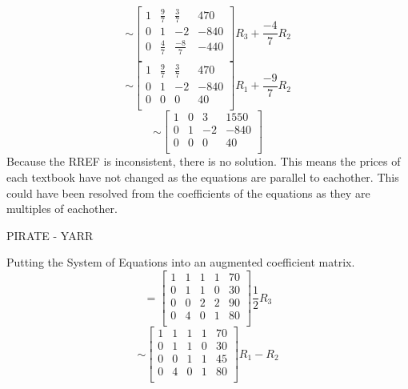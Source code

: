 \documentclass[12pt]{article}
\newenvironment{problem}[2][Problem]{\begin{trivlist}
\item[\hskip \labelsep {\bfseries #1}\hskip \labelsep {\bfseries #2.}]}{\end{trivlist}}
\begin{document}
	\[\sim
		\left[
		\begin{array}{ccc|c}
		1 & \frac{9}{7} & \frac{3}{7} & 470\\
		0 & 1 & -2 & -840\\
		0 & \frac{4}{7} & \frac{-8}{7} & -440\\
		\end{array}
		\right] R_3 + \frac{-4}{7}R_2
	\]
	\[\sim
		\left[
		\begin{array}{ccc|c}
		1 & \frac{9}{7} & \frac{3}{7} & 470\\
		0 & 1 & -2 & -840\\
		0 & 0 & 0 & 40\\
		\end{array}
		\right] R_1 + \frac{-9}{7}R_2
	\]
	\[\sim
		\left[
		\begin{array}{ccc|c}
		1 & 0 & 3 & 1550\\
		0 & 1 & -2 & -840\\
		0 & 0 & 0 & 40\\
		\end{array}
		\right] 
	\]
Because the RREF is inconsistent, there is no solution. This means the prices of each textbook have not changed as the equations are parallel to eachother. This could have been resolved from the coefficients of the equations as they are multiples of eachother.
\begin{problem}{8}
	PIRATE - YARR
\end{problem}
Putting the System of Equations into an augmented coefficient matrix.
	\[=
		\left[
			\begin{array}{cccc|c}
			1 & 1 & 1 & 1 & 70\\
			0 & 1 & 1 & 0 & 30\\
			0 & 0 & 2 & 2 & 90\\
			0 & 4 & 0 & 1 & 80\\
			\end{array}
		\right] \frac{1}{2} R_3
	\]
	\[\sim
		\left[
			\begin{array}{cccc|c}
			1 & 1 & 1 & 1 & 70\\
			0 & 1 & 1 & 0 & 30\\
			0 & 0 & 1 & 1 & 45\\
			0 & 4 & 0 & 1 & 80\\
			\end{array}
		\right] R_1 - R_2
	\]
	
\end{document}

